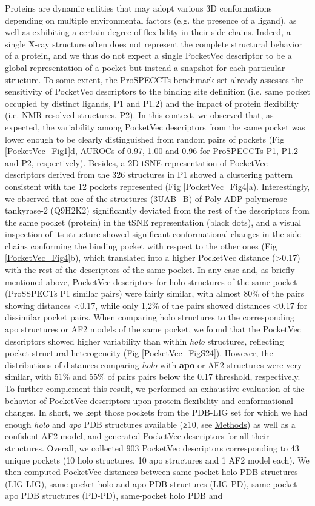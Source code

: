 Proteins are dynamic entities that may adopt various 3D conformations depending on multiple environmental factors (e.g. the presence of a ligand), as well as exhibiting a certain degree of flexibility in their side chains. Indeed, a single X-ray structure often does not represent the complete structural behavior of a protein, and we thus do not expect a single PocketVec descriptor to be a global representation of a pocket but instead a snapshot for each particular structure. To some extent, the ProSPECCTs benchmark set already assesses the sensitivity of PocketVec descriptors to the binding site definition (i.e. same pocket occupied by distinct ligands, P1 and P1.2) and the impact of protein flexibility (i.e. NMR-resolved structures, P2). In this context, we observed that, as expected, the variability among PocketVec descriptors from the same pocket was lower enough to be clearly distinguished from random pairs of pockets (Fig \ref{PocketVec_Fig1}d, AUROCs of 0.97, 1.00 and 0.96 for ProSPECCTs P1, P1.2 and P2, respectively). Besides, a 2D tSNE representation of PocketVec descriptors derived from the 326 structures in P1 showed a clustering pattern consistent with the 12 pockets represented (Fig \ref{PocketVec_Fig4}a). Interestingly, we observed that one of the structures (3UAB\_B) of Poly-ADP polymerase tankyrase-2 (Q9H2K2) significantly deviated from the rest of the descriptors from the same pocket (protein) in the tSNE representation (black dots), and a visual inspection of its structure showed significant conformational changes in the side chains conforming the binding pocket with respect to the other ones (Fig \ref{PocketVec_Fig4}b), which translated into a higher PocketVec distance (>0.17) with the rest of the descriptors of the same pocket. In any case and, as briefly mentioned above, PocketVec descriptors for holo structures of the same pocket (ProSSPECTs P1 similar pairs) were fairly similar, with almost 80\% of the pairs showing distances <0.17, while only 1,2\% of the pairs showed distances <0.17 for dissimilar pocket pairs. When comparing holo structures to the corresponding apo structures or AF2 models of the same pocket, we found that the PocketVec descriptors showed higher variability than within \textit{holo} structures, reflecting pocket structural heterogeneity (Fig \ref{PocketVec_FigS24}). However, the distributions of distances comparing \textit{holo} with \textbf{apo} or AF2 structures were very similar, with 51\% and 55\% of pairs pairs below the 0.17 threshold, respectively. To further complement this result, we performed an exhaustive evaluation of the behavior of PocketVec descriptors upon protein flexibility and conformational changes. In short, we kept those pockets from the PDB-LIG set for which we had enough \textit{holo} and \textit{apo} PDB structures available (≥10, see \hyperref[PocketVec_Methods]{Methods}) as well as a confident AF2 model, and generated PocketVec descriptors for all their structures. Overall, we collected 903 PocketVec descriptors corresponding to 43 unique pockets (10 holo structures, 10 apo structures and 1 AF2 model each). We then computed PocketVec distances between same-pocket holo PDB structures (LIG-LIG), same-pocket holo and apo PDB structures (LIG-PD), same-pocket apo PDB structures (PD-PD), same-pocket holo PDB and 